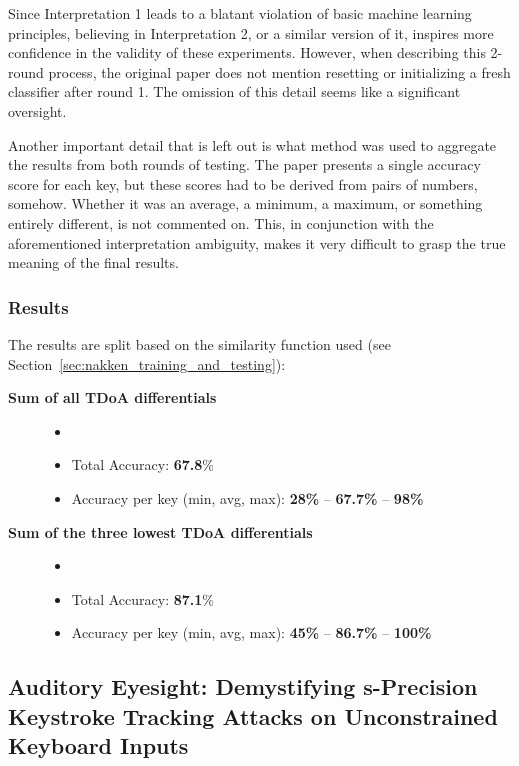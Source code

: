 \documentclass[../main.tex]{subfiles}
\begin{document}
Since Interpretation 1 leads to a blatant violation of basic machine
learning principles, believing in Interpretation 2, or a similar version of it,
inspires more confidence in the validity of these experiments. However,
when describing this 2-round process, the original paper does not mention
resetting or initializing a fresh classifier after round 1. The omission of
this detail seems like a significant oversight.

Another important detail that is left out is what method was used to aggregate
the results from both rounds of testing. The paper presents a single accuracy
score for each key, but these scores had to be derived from pairs of numbers,
somehow. Whether it was an average, a minimum, a maximum, or something entirely different, is not commented on. This, in conjunction with the aforementioned interpretation ambiguity, makes it very difficult to grasp the true meaning of the final results.

\subsubsection{Results}
The results are split based on the similarity function used (see Section~\ref{sec:nakken_training_and_testing}):
\begin{description}
    \item [\textbf{Sum of all TDoA differentials}]
    \begin{itemize} \item[]
        \item Total Accuracy: \textbf{67.8}\%
        \item Accuracy per key (min, avg, max): \textbf{28\%} -- \textbf{67.7\%} -- \textbf{98\%}
    \end{itemize}
    \item [\textbf{Sum of the three lowest TDoA differentials}]
    \begin{itemize} \item[]
        \item Total Accuracy: \textbf{87.1}\%
        \item Accuracy per key (min, avg, max): \textbf{45\%} -- \textbf{86.7\%} -- \textbf{100\%}
    \end{itemize}
\end{description}

\subsection{Auditory Eyesight: Demystifying \textmu s-Precision
Keystroke Tracking Attacks on Unconstrained 
Keyboard Inputs}
\label{sec:auditory_eyesight_demystifying}
\end{document}
